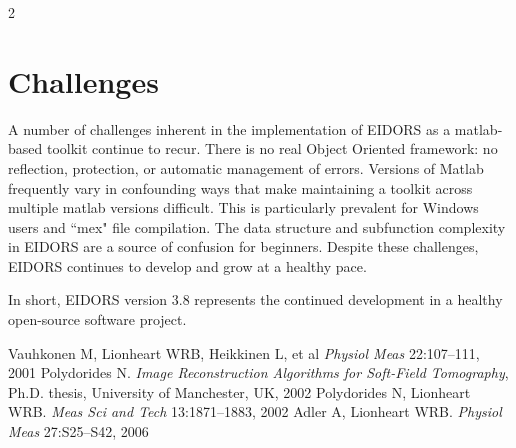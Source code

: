 \documentclass[10pt,a4paper]{article}
\renewenvironment{thebibliography}[1]{%
    \begin{oldthebibliography}{#1}%
      \setlength{\parskip}{0ex}%
      \setlength{\itemsep}{0ex}%
  }%
  {%
    \end{oldthebibliography}%
  }
\begin{document}
\begin{multicols}{2}
\section{Challenges}
A number of challenges inherent in the implementation of EIDORS as a matlab-based toolkit continue to recur.
There is no real Object Oriented framework: no reflection, protection, or
  automatic management of errors.
Versions of Matlab frequently vary in confounding ways that make
  maintaining a toolkit across multiple matlab versions difficult. This is
  particularly prevalent for Windows users and ``mex" file compilation.
The data structure and subfunction complexity in EIDORS are a
  source of confusion for beginners.
Despite these challenges, EIDORS continues to develop and grow at a healthy pace.

In short, EIDORS version 3.8 represents the continued development
in a healthy open-source software project.

\footnotesize
\begin{thebibliography}{}
   Vauhkonen M, Lionheart WRB, Heikkinen L, et al
   {\em  Physiol Meas} 22:107--111, 2001
   Polydorides N.
 {\em Image Reconstruction Algorithms for Soft-Field Tomography}, Ph.D. thesis, University of Manchester, UK, 2002
   Polydorides N, Lionheart WRB.
   {\em Meas Sci and Tech} 13:1871--1883, 2002
Adler A, Lionheart WRB. {\em Physiol Meas} 27:S25--S42, 2006
\end{thebibliography}
\end{multicols}
\end{document}
